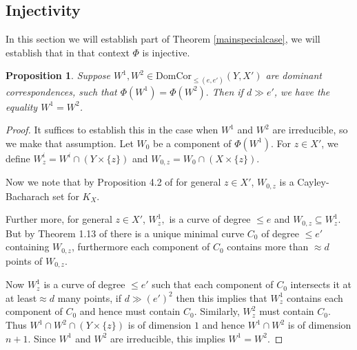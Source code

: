 \documentclass[12pt]{amsart}
\numberwithin{equation}{section}
\newtheorem{proposition}[theorem]{Proposition}
\numberwithin{theorem}{section}
\theoremstyle{definition}
\theoremstyle{definition}
\def \DC{{\mathrm{DomCor}}}
\begin{document}
\subsection{Injectivity}
In this section we will establish part of Theorem \ref{mainspecialcase},  we will establish that  in that context $\Phi$ is injective.

\begin{proposition}
    Suppose $W^1, W^2 \in \DC_{\le (e,e')}(Y,X')$ are dominant correspondences, such that $\Phi(W^1) = \Phi(W^2).$ Then if $d \gg e'$, we have the equality 
    $W^1 = W^2$.
\end{proposition} 
\begin{proof}
     It suffices to establish this in the case when $W^1$ and $W^2$ are irreducible, so we make that assumption. Let $W_0$ be a component of $\Phi(W^1)$.
     For $z \in X'$, we define $W^i_z =   W^i \cap (Y \times \{z\})$ and $W_{0,z} = W_0 \cap (X \times \{z\}).$

    Now we note that by Proposition 4.2 of \cite{Bast} for general $z \in X'$,  $W_{0,z}$ is a Cayley-Bacharach set for $K_X$.

       Further more,  for general $z \in X'$, $W^1_z,$ is a curve of degree $\le e$ and $W_{0,z} \subseteq W^1_z$. But by Theorem 1.13 of \cite{Ban} there is a unique minimal curve $C_0$ of degree $\le e'$ containing $W_{0,z}$, furthermore each component of $C_0$ contains more than $\approx d$ points of $W_{0,z}$.

  Now $W^1_z$ is a curve of degree $ \le e'$ such that 
 each component of $C_0$ intersects it at at least$\approx d$ many points, if $ d \gg (e')^2$ then this implies that $W^1_z$ contains each component of $C_0$ and hence  must contain $C_0$.  Similarly, $W^2_z$ must contain $C_0$. Thus $W^1 \cap W^2 \cap (Y \times \{z\})$ is of dimension $1$ and hence $W^1 \cap W^2$ is of dimension $n+1$. Since $W^1$ and $W^2$ are irreducible, this implies $W^1 =W^2$.     
\end{proof}
\end{document}
